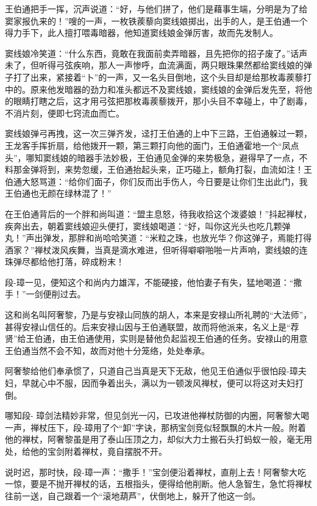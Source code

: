 \documentclass[12pt,oneside]{book}
\begin{document}
王伯通把手一挥，沉声说道：``好，与他们拼了，他们是藉事生端，分明是为了给窦家报仇来的！''嗖的一声，一枚铁蒺藜向窦线娘掷出，出手的人，是王伯通一个得力手下，此人擅打喂毒暗器，他知道窦线娘金弹厉害，故而先发制人。

窦线娘冷笑道：``什么东西，竟敢在我面前卖弄暗器，且先把你的招子废了。''话声未了，但听得弓弦疾响，那人一声惨呼，血流满面，两只眼珠果然都给窦线娘的弹子打了出来，紧接着``卜''的一声，又一名头目倒地，这个头目却是给那枚毒蒺藜打中的。原来他发暗器的劲力和准头都远不及窦线娘，窦线娘的金弹后发先至，将他的眼睛打瞎之后，这才用弓弦把那枚毒蒺藜拨开，那小头目不幸碰上，中了剧毒，不消片刻，便即七窍流血而亡。

窦线娘弹弓再拽，这一次三弹齐发，迳打王伯通的上中下三路，王伯通躲过一颗，王龙客手挥折扇，给他拨开一颗，第三颗打向他的面门，王伯通霍地一个``凤点头''，哪知窦线娘的暗器手法妙极，王伯通见金弹的来势极急，避得早了一点，不料那金弹将到，来势忽缓，王伯通抬起头来，正巧碰上，额角打裂，血流如注！王伯通大怒骂道：``给你们面子，你们反而出手伤人，今日要是让你们生出此门，我王伯通也无颜在绿林混了！''

在王伯通背后的一个胖和尚叫道：``盟主息怒，待我收拾这个泼婆娘！''抖起禅杖，疾奔出去，朝着窦线娘迎头便打，窦线娘喝道：``好，叫你这光头也吃几颗弹丸！''声出弹发，那胖和尚哈哈笑道：``米粒之珠，也放光华？你这弹子，焉能打得酒家？''禅杖泼风疾舞，当真是滴水难进，但听得噼噼啪啪一片声响，窦线娘的连珠弹尽都给他打落，碎成粉末！

段-璋一见，便知这个和尚内力雄浑，不能硬接，他怕妻子有失，猛地喝道：``撒手！''一剑便削过去。

这和尚名叫阿奢黎，乃是与安禄山同族的胡人，本来是安禄山所礼聘的``大法师''，甚得安禄山信任的。后来安禄山因与王伯通联盟，故而将他派来，名义上是``荐贤''给王伯通，由王伯通使用，实则是替他负起监视王伯通的任务。安禄山的用意王伯通当然不会不知，故而对他十分笼络，处处奉承。

阿奢黎给他们奉承惯了，只道自己当真是天下无敌，他见王伯通似乎很怕段-璋夫妇，早就心中不服，因而争着出头，满以为一顿泼风禅杖，便可以将这对夫妇打倒。

哪知段-
璋剑法精妙非常，但见剑光一闪，已攻进他禅杖防御的内圈，阿奢黎大喝一声，禅杖压下，段-璋用了个``卸''字诀，那柄宝剑竞似轻飘飘的木片一般。附着他的禅杖，阿奢黎虽是用了泰山压顶之力，却似大力士搬石头打蚂蚁一般，毫无用处，给他的宝剑附着禅杖，竟自摆脱不开。

说时迟，那时快，段-璋一声：``撒手！''宝剑便沿着禅杖，直削上去！阿奢黎大吃一惊，要是不抛开禅杖的话，五根指头，便得给他削断。他人急智生，急忙将禅杖往前一送，自己跟着一个``滚地葫芦''，伏倒地上，躲开了他这一剑。
\end{document}
